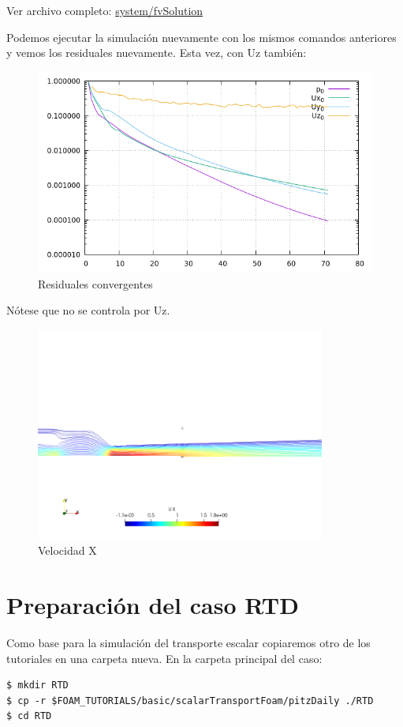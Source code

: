 \documentclass{article}
\begin{document}
\noindent Ver archivo completo: \href{https://github.com/guillerolle/casos_cfd/blob/master/02/system/fvSolution}{system/fvSolution}

\newpage
Podemos ejecutar la simulación nuevamente con los mismos comandos anteriores y vemos los residuales nuevamente. Esta vez, con Uz también:

\begin{figure}[h!]
	\centering
	\includegraphics[width=1\textwidth]{Figuras/04_residuales_siconv.png}
	\caption{Residuales convergentes}
	\label{fig:resid_siconv}
\end{figure}

Nótese que no se controla por Uz.
\begin{figure}[h!]
	\centering
	\includegraphics[width=0.85\textwidth]{Figuras/04_traza.png}
	\caption{Velocidad X}
	\label{fig:sF_Ux}
\end{figure}

\section{Preparación del caso RTD}
Como base para la simulación del transporte escalar copiaremos otro de los tutoriales en una carpeta nueva. En la carpeta principal del caso:
\begin{lstlisting}
$ mkdir RTD
$ cp -r $FOAM_TUTORIALS/basic/scalarTransportFoam/pitzDaily ./RTD
$ cd RTD
\end{lstlisting}
\end{document}
